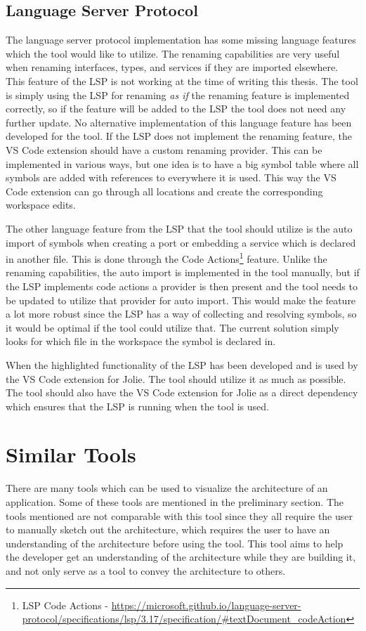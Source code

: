 \subsection{Language Server Protocol}
The language server protocol implementation has some missing language features which the tool would like to utilize.
The renaming capabilities are very useful when renaming interfaces, types, and services if they are imported elsewhere. This feature of the LSP is not working at the time of writing this thesis.
The tool is simply using the LSP for renaming \emph{as if} the renaming feature is implemented correctly, so if the feature will be added to the LSP the tool does not need any further update.
No alternative implementation of this language feature has been developed for the tool. If the LSP does not implement the renaming feature, the VS Code extension should have a custom renaming provider.
This can be implemented in various ways, but one idea is to have a big symbol table where all symbols are added with references to everywhere it is used. This way the VS Code extension can go through all locations and create the corresponding workspace edits.

The other language feature from the LSP that the tool should utilize is the auto import of symbols when creating a port or embedding a service which is declared in another file.
This is done through the Code Actions\footnote{LSP Code Actions - \url{https://microsoft.github.io/language-server-protocol/specifications/lsp/3.17/specification/\#textDocument_codeAction}}
feature. Unlike the renaming capabilities, the auto import is implemented in the tool manually, but if the LSP implements code actions a provider is then present and the tool needs to be updated to utilize that provider for auto import.
This would make the feature a lot more robust since the LSP has a way of collecting and resolving symbols, so it would be optimal if the tool could utilize that. The current solution simply looks for which file in the workspace the symbol is declared in.

When the highlighted functionality of the LSP has been developed and is used by the VS Code extension for Jolie. The tool should utilize it as much as possible.
The tool should also have the VS Code extension for Jolie as a direct dependency which ensures that the LSP is running when the tool is used.

\section{Similar Tools}
There are many tools which can be used to visualize the architecture of an application. Some of these tools are mentioned in the preliminary section.
The tools mentioned are not comparable with this tool since they all require the user to manually sketch out the architecture, which requires the user to have an understanding of the architecture before using the tool.
This tool aims to help the developer get an understanding of the architecture while they are building it, and not only serve as a tool to convey the architecture to others.

